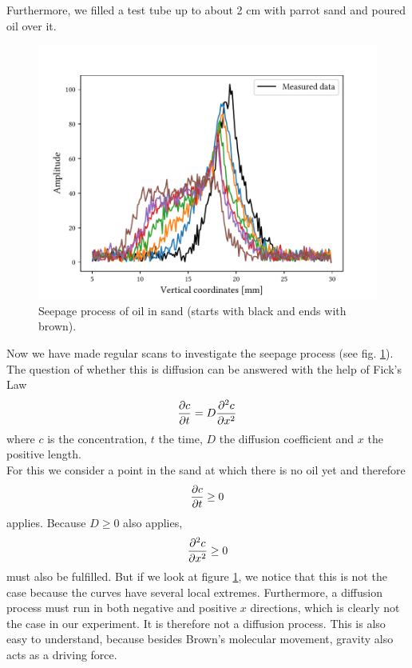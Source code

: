 Furthermore, we filled a test tube up to about 2 cm with parrot sand and poured oil over it.
\begin{figure}[ht]
\centering
\includegraphics[scale=.6]{..//figures//f61_abb_9.pdf}
\caption{Seepage process of oil in sand (starts with black and ends with brown).}
\label{fig:sand}
\end{figure}
Now we have made regular scans to investigate the seepage process (see fig. \ref{fig:sand}).\\
The question of whether this is diffusion can be answered with the help of Fick's Law
\begin{align}
\pdv{c}{t}=D\pdv[2]{c}{x}
\end{align}
where $c$ is the concentration, $t$ the time, $D$ the diffusion coefficient and $x$ the positive length.\\
For this we consider a point in the sand at which there is no oil yet and therefore
\begin{align*}
\pdv{c}{t}\geq0
\end{align*}
applies.
Because $D\geq0$ also applies,
\begin{align*}
\pdv[2]{c}{x}\geq0
\end{align*}
must also be fulfilled.
But if we look at figure \ref{fig:sand}, we notice that this is not the case because the curves have several local extremes.
Furthermore, a diffusion process must run in both negative and positive $x$ directions, which is clearly not the case in our experiment.
It is therefore not a diffusion process.
This is also easy to understand, because besides Brown's molecular movement, gravity also acts as a driving force.

